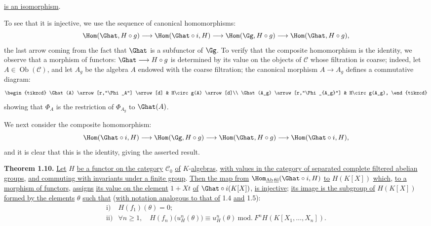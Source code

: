 %
\uline{is an isomorphism}.

To see that it is injective, we use the sequence of canonical homomorphisms:
\[
  \Hom(\Ghat,H\circ g)\longrightarrow
  \Hom(\Ghat\circ i,H)\longrightarrow
  \Hom(\Gg,H\circ g)\longrightarrow
  \Hom(\Ghat,H\circ g),
\]
the last arrow coming from the fact that \(\Ghat\) is a subfunctor of \(\Gg\). To verify that the composite homomorphism is the identity, we observe that a morphism of functors: \(\Ghat\longrightarrow H\circ g\) is determined by its value on the objects of \(\mathcal C\) whose filtration is coarse; indeed, let \(A\in\operatorname{Ob}(\mathcal C)\), and let \(A_g\) be the algebra \(A\) endowed with the coarse filtration; the canonical morphism \(A\to A_g\) defines a commutative diagram:
\[
\begin{tikzcd}
\Ghat(A) \arrow[r,"\Phi_A"] \arrow[d] &
H\circ g(A) \arrow[d]\\
\Ghat(A_g) \arrow[r,"\Phi_{A_g}"] &
H\circ g(A_g),
\end{tikzcd}
\]
showing that \(\Phi_A\) is the restriction of \(\Phi_{A_g}\) to \(\Ghat(A)\).

We next consider the composite homomorphism:
\[
  \Hom(\Ghat\circ i,H)\longrightarrow
  \Hom(\Gg,H\circ g)\longrightarrow
  \Hom(\Ghat,H\circ g)\longrightarrow
  \Hom(\Ghat\circ i,H),
\]
and it is clear that this is the identity, giving the asserted result.

\textbf{Theorem 1.10.} \uline{Let} \(H\) \uline{be a functor on the category} \(\mathcal C_0\) \uline{of} \(K\)-\uline{algebras}, \uline{with values in the category of separated complete filtered abelian groups}, \uline{and commuting with invariants under a finite group}. \uline{Then the map from} \(\Hom_{\underline{\mathrm{Ab}}\,\underline{\mathrm{fil}}}(\Ghat\circ i,H)\) \uline{to} \(H(K[X])\) \uline{which}, \uline{to a morphism of functors}, \uline{assigns}
%
\uline{its value on the element} \(1+Xt\) \uline{of} \(\Ghat\circ i(K[X])\), \uline{is injective}; \uline{its image is the subgroup of} \(H(K[X])\) \uline{formed by the elements} \(\theta\) \uline{such that} (\uline{with notation analogous to that of} 1.4 \uline{and} 1.5):
\[
\begin{array}{ll}
\text{i)}& H(f_1)(\theta)=0;\\[0.3em]
\text{ii)}& \forall n\geq1,\quad
H(f_n)\bigl(u_H^n(\theta)\bigr)\equiv u_H^n(\theta)
\ \mathrm{mod.}\ F^nH(K[X_1,\ldots,X_n]).
\end{array}
\]

